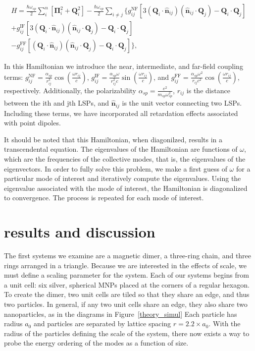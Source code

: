\documentclass[journal=apchd5,manuscript=article]{achemso}
\begin{document}
\begin{equation}
\begin{aligned}
H = 
\frac{\hbar\omega_{sp}}{2}\sum_{i}^{n}[\boldsymbol{\Pi}_i^2 + \textbf{Q}_i^2] - \frac{\hbar\omega_{sp}}{2}\sum_{i\neq j}\{g_{ij}^{\textrm{NF}}\left[3(\textbf{Q}_i\cdot\hat{\textbf{n}}_{ij})(\hat{\textbf{n}}_{ij}\cdot\textbf{Q}_j) - \textbf{Q}_i\cdot\textbf{Q}_j\right] \\
+ g_{ij}^{\textrm{IF}}\left[3(\textbf{Q}_i\cdot\hat{\textbf{n}}_{ij})(\hat{\textbf{n}}_{ij}\cdot\textbf{Q}_j) -\textbf{Q}_i\cdot\textbf{Q}_j\right] \\ 
- g_{ij}^{\textrm{FF}}\left[(\textbf{Q}_i\cdot\hat{\textbf{n}}_{ij})(\hat{\textbf{n}}_{ij}\cdot\textbf{Q}_j) -\textbf{Q}_i\cdot\textbf{Q}_j\right]\},\label{elec_hammy_2}
\end{aligned}
\end{equation}

In this Hamiltonian we introduce the near, intermediate, and far-field coupling terms: $g_{ij}^{\textrm{NF}} = \frac{\alpha_{sp}}{r_{ij}^3}\cos\left(\frac{\omega r_{ij}}{c}\right)$, $g_{ij}^{\textrm{IF}} = \frac{\alpha_{sp}\omega}{r_{ij}^2 c}\sin\left(\frac{\omega r_{ij}}{c}\right)$, and $g_{ij}^{\textrm{FF}} = \frac{\alpha_{sp}\omega^2}{r_{ij} c^2}\cos\left(\frac{\omega r_{ij}}{c}\right)$, respectively. Additionally, the polarizability $\alpha_{sp} = \frac{e^2}{m_{sp}\omega_{sp}^2}$, $r_{ij}$ is the distance between the ith and jth LSPs, and $\hat{\textbf{n}}_{ij}$ is the unit vector connecting two LSPs. Including these terms, we have incorporated all retardation effects associated with point dipoles\cite{Purcell1973}.

It should be noted that this Hamiltonian, when diagonilzed, results in a transcendental equation. The eigenvalues of the Hamiltonian are functions of $\omega$, which are the frequencies of the collective modes, that is, the eigenvalues of the eigenvectors. In order to fully solve this problem, we make a first guess of $\omega$ for a particular mode of interest and iteratively compute the eigenvalues. Using the eigenvalue associated with the mode of interest, the Hamiltonian is diagonalized to convergence. The process is repeated for each mode of interest.

\section{results and discussion}
The first systems we examine are a magnetic dimer\cite{Cherqui2014}, a three-ring chain, and three rings arranged in a triangle. Because we are interested in the effects of scale, we must define a scaling parameter for the system. Each of our systems begins from a unit cell: six silver, spherical MNPs placed at the corners of a regular hexagon. To create the dimer, two unit cells are tiled so that they share an edge, and thus two particles. In general, if any two unit cells share an edge, they also share two nanoparticles, as in the diagrams in Figure~\ref{theory_simul} Each particle has radius $a_0$ and particles are separated by lattice spacing $r=2.2\times a_0$. With the radius of the particles defining the scale of the system, there now exists a way to probe the energy ordering of the modes as a function of size.
\end{document}
